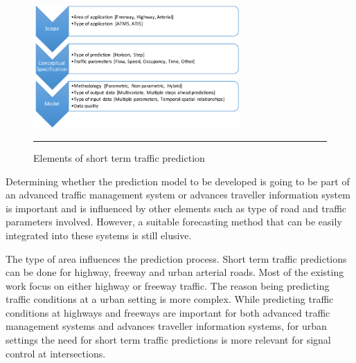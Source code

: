 \begin{figure}[htbp]
  \centering
    \includegraphics[width=0.7\textwidth,height=0.7\textheight,keepaspectratio]{Figures/sttp-process.pdf}
    \rule{35em}{0.5pt}
  \caption[Elements of short term traffic prediction]{Elements of short term traffic prediction}
  \label{fig:sttp-process}
\end{figure}

Determining whether the prediction model to be developed is going to be part of an advanced
traffic management system or advances traveller information system is important and is influenced
by other elements such as type of road and traffic parameters involved. However, a suitable
forecasting method that can be easily integrated into these systems is still elusive.

The type of area influences the prediction process. Short term traffic predictions can be done for
highway, freeway and urban arterial roads. Most of the existing work focus on either highway or
freeway traffic. The reason being predicting traffic conditions at a urban setting is more complex.
While predicting traffic conditions at highways and freeways are important for both advanced traffic
management systems and advances traveller information systems, for urban settings the need for short
term traffic predictions is more relevant for signal control at intersections.

